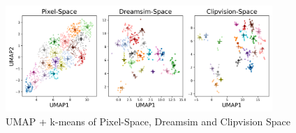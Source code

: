 \begin{figure}[ht]
    \centering
    \includegraphics[width=0.9\textwidth]{plots/dropout_umap.png}
    \caption{UMAP + k-means of Pixel-Space, Dreamsim and Clipvision Space}\label{fig:dropout_umap}
\end{figure}




